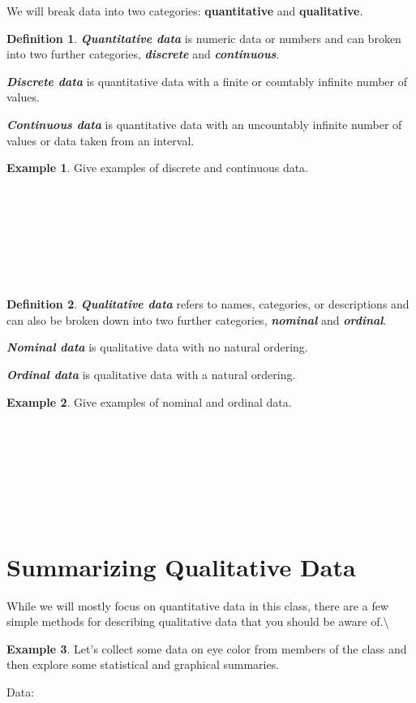 \documentclass[
  11pt,
  oneside]{book}
\theoremstyle{definition}
\newtheorem{definition}{Definition}[chapter]
\theoremstyle{definition}
\newtheorem{example}{Example}[chapter]
\theoremstyle{definition}
\theoremstyle{definition}
\theoremstyle{remark}
\begin{document}
We will break data into two categories: \textbf{quantitative} and \textbf{qualitative}.

\begin{definition}
\textbf{\emph{Quantitative data}} is numeric data or numbers and can broken into two further categories, \textbf{\emph{discrete}} and \textbf{\emph{continuous}}.

\textbf{\emph{Discrete data}} is quantitative data with a finite or countably infinite number of values.

\textbf{\emph{Continuous data}} is quantitative data with an uncountably infinite number of values or data taken from an interval.
\end{definition}

\begin{example}
Give examples of discrete and continuous data.
\end{example}

\(~\)

\(~\)

\(~\)

\(~\)

\begin{definition}
\textbf{\emph{Qualitative data}} refers to names, categories, or descriptions and can also be broken down into two further categories, \textbf{\emph{nominal}} and \textbf{\emph{ordinal}}.

\textbf{\emph{Nominal data}} is qualitative data with no natural ordering.

\textbf{\emph{Ordinal data}} is qualitative data with a natural ordering.
\end{definition}

\begin{example}
Give examples of nominal and ordinal data.
\end{example}

\(~\)

\(~\)

\(~\)

\(~\)

\section{Summarizing Qualitative Data}\label{summarizing-qualitative-data}

While we will mostly focus on quantitative data in this class, there are a few simple methods for describing qualitative data that you should be aware of.\textbackslash{}

\begin{example}
Let's collect some data on eye color from members of the class and then explore some statistical and graphical summaries.

Data:
\end{example}
\end{document}
